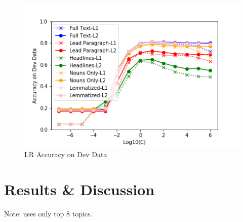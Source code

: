 \documentclass[11pt,a4paper,table]{article}
\begin{document}
\begin{figure}
\centering
\includegraphics[scale=0.55]{lr_accuracy}
\caption{LR Accuracy on Dev Data}
\label{fig:lr-acc}
\end{figure}

\begin{table}
\centering
{}
\caption{CNN Vocabulary and Padding Sizes}
\label{tbl:cnn}
\end{table}

\section{Results \& Discussion}
\label{sec:results}

Note: \cite{Wermter:02} uses only top 8 topics.
\end{document}
